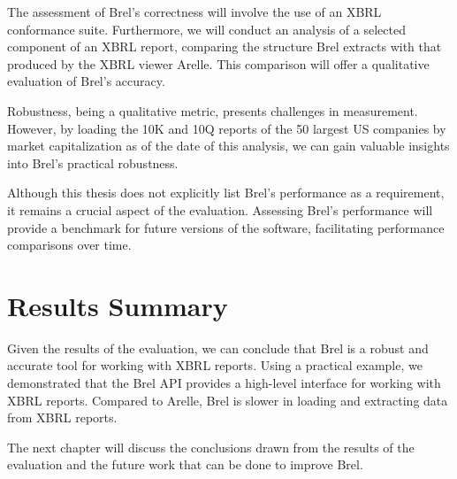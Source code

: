 The assessment of Brel's correctness will involve the use of an XBRL conformance suite. 
Furthermore, we will conduct an analysis of a selected component of an XBRL report, 
comparing the structure Brel extracts with that produced by the XBRL viewer Arelle. 
This comparison will offer a qualitative evaluation of Brel's accuracy.

Robustness, being a qualitative metric, presents challenges in measurement. 
However, by loading the 10K and 10Q reports of the 50 largest US companies by market capitalization as of the date of this analysis, 
we can gain valuable insights into Brel's practical robustness.

Although this thesis does not explicitly list Brel's performance as a requirement, 
it remains a crucial aspect of the evaluation. 
Assessing Brel's performance will provide a benchmark for future versions of the software, 
facilitating performance comparisons over time.



\pagebreak






\section{Results Summary}
Given the results of the evaluation, we can conclude that Brel is a robust and accurate tool for working with XBRL reports.
Using a practical example, we demonstrated that the Brel API provides a high-level interface for working with XBRL reports.
Compared to Arelle, Brel is slower in loading and extracting data from XBRL reports.

The next chapter will discuss the conclusions drawn from the results of the evaluation and the future work that can be done to improve Brel.
